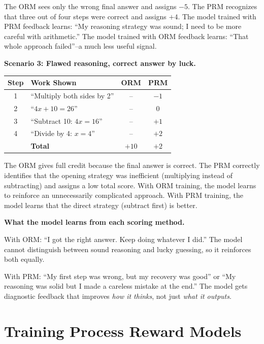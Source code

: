 \begin{chapterenv}
The ORM sees only the wrong final answer and assigns $-5$. The PRM recognizes that three out of four steps were correct and assigns $+4$. The model trained with PRM feedback learns: ``My reasoning strategy was sound; I need to be more careful with arithmetic.'' The model trained with ORM feedback learns: ``That whole approach failed''--a much less useful signal.

\textbf{Scenario 3: Flawed reasoning, correct answer by luck.}

\begin{center}
\begin{tabular}{clcc}
\toprule
\textbf{Step} & \textbf{Work Shown} & \textbf{ORM} & \textbf{PRM} \\
\midrule
1 & ``Multiply both sides by 2'' & -- & $-1$ \\
2 & ``$4x + 10 = 26$'' & -- & $0$ \\
3 & ``Subtract 10: $4x = 16$'' & -- & $+1$ \\
4 & ``Divide by 4: $x = 4$'' & -- & $+2$ \\
\midrule
& \textbf{Total} & $+10$ & $+2$ \\
\bottomrule
\end{tabular}
\end{center}

The ORM gives full credit because the final answer is correct. The PRM correctly identifies that the opening strategy was inefficient (multiplying instead of subtracting) and assigns a low total score. With ORM training, the model learns to reinforce an unnecessarily complicated approach. With PRM training, the model learns that the direct strategy (subtract first) is better.

\begin{tipbox}
\textbf{What the model learns from each scoring method.}

With ORM: ``I got the right answer. Keep doing whatever I did.'' The model cannot distinguish between sound reasoning and lucky guessing, so it reinforces both equally.

With PRM: ``My first step was wrong, but my recovery was good'' or ``My reasoning was solid but I made a careless mistake at the end.'' The model gets diagnostic feedback that improves \textit{how it thinks}, not just \textit{what it outputs}.
\end{tipbox}

\section{Training Process Reward Models}


\end{chapterenv}
